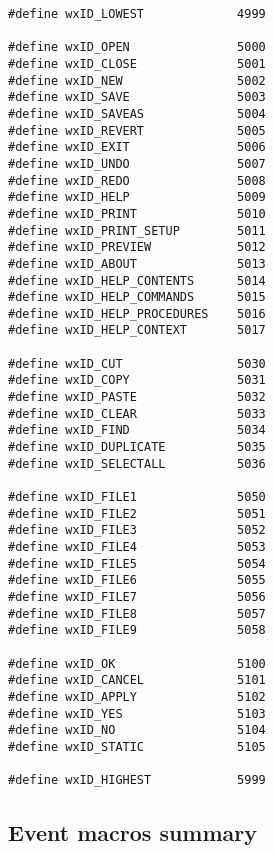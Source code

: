 \begin{verbatim}
#define wxID_LOWEST             4999

#define wxID_OPEN               5000
#define wxID_CLOSE              5001
#define wxID_NEW                5002
#define wxID_SAVE               5003
#define wxID_SAVEAS             5004
#define wxID_REVERT             5005
#define wxID_EXIT               5006
#define wxID_UNDO               5007
#define wxID_REDO               5008
#define wxID_HELP               5009
#define wxID_PRINT              5010
#define wxID_PRINT_SETUP        5011
#define wxID_PREVIEW            5012
#define wxID_ABOUT              5013
#define wxID_HELP_CONTENTS      5014
#define wxID_HELP_COMMANDS      5015
#define wxID_HELP_PROCEDURES    5016
#define wxID_HELP_CONTEXT       5017

#define wxID_CUT                5030
#define wxID_COPY               5031
#define wxID_PASTE              5032
#define wxID_CLEAR              5033
#define wxID_FIND               5034
#define wxID_DUPLICATE          5035
#define wxID_SELECTALL          5036

#define wxID_FILE1              5050
#define wxID_FILE2              5051
#define wxID_FILE3              5052
#define wxID_FILE4              5053
#define wxID_FILE5              5054
#define wxID_FILE6              5055
#define wxID_FILE7              5056
#define wxID_FILE8              5057
#define wxID_FILE9              5058

#define wxID_OK                 5100
#define wxID_CANCEL             5101
#define wxID_APPLY              5102
#define wxID_YES                5103
#define wxID_NO                 5104
#define wxID_STATIC             5105

#define wxID_HIGHEST            5999
\end{verbatim}

\subsection{Event macros summary}\label{eventmacros}


\twocolwidtha{8cm}%
\begin{twocollist}\itemsep=0pt
\end{twocollist}

